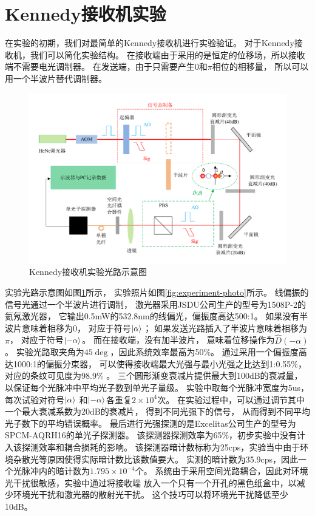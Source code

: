 \section{Kennedy接收机实验}

在实验的初期，我们对最简单的Kennedy接收机进行实验验证。
对于Kennedy接收机，我们可以简化实验结构。
在接收端由于采用的是恒定的位移场，所以接收端不需要电光调制器。
在发送端，由于只需要产生$0$和$\pi$相位的相移量，
所以可以用一个半波片替代调制器。




\begin{figure}
\centering
  \includegraphics[width=\textwidth]{figures/chap5/Kennedy-receiver-diagram}
  \caption{Kennedy接收机实验光路示意图}
  \label{fig:Kennedy-receiver-diagram}
\end{figure}

实验光路示意图如图\ref{fig:Kennedy-receiver-diagram}所示，
实验照片如图\ref{fig:experiment-photo}所示。
线偏振的信号光通过一个半波片进行调制，
激光器采用JSDU公司生产的型号为1508P-2的氦氖激光器，
它输出0.5mW的532.8nm的线偏光，偏振度高达500:1。 
如果没有半波片意味着相移为$0$，
对应于符号$\ket{\alpha}$；
如果发送光路插入了半波片意味着相移为$\pi$，
对应于符号$\ket{-\alpha}$。
而在接收端，没有加半波片，
意味着位移操作为$\hat{D}(-\alpha)$。
实验光路取夹角为$45 \deg$，因此系统效率最高为50\%。
通过采用一个偏振度高达1000:1的偏振分束器，
可以使得接收端最大光强与最小光强之比达到1:0.55\%，对应的条纹可见度为98.9\% 。
三个圆形渐变衰减片提供最大到100dB的衰减量，
以保证每个光脉冲中平均光子数到单光子量级。
实验中取每个光脉冲宽度为5us，每次试验对符号$\ket{\alpha}$
和$\ket{-\alpha}$各重复$2\times 10^4$次。
在实验过程中，可以通过调节其中一个最大衰减系数为20dB的衰减片，
得到不同光强下的信号，
从而得到不同平均光子数下的平均错误概率。
最后进行光强探测的是Excelitas公司生产的型号为SPCM-AQRH16的单光子探测器。
该探测器探测效率为65\%，初步实验中没有计入该探测效率和耦合损耗的影响。
该探测器暗计数标称为25cps，实验当中由于环境杂散光等原因使得实际暗计数比该数值要大。
实测的暗计数为35.9cps，因此一个光脉冲内的暗计数为$1.795\times 10^{-4}$个。
系统由于采用空间光路耦合，因此对环境光干扰很敏感，实验中通过将接收端
放入一个只有一个开孔的黑色纸盒中，以减少环境光干扰和激光器的散射光干扰。
这个技巧可以将环境光干扰降低至少10dB。


